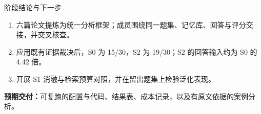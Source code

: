 \documentclass[aspectratio=169,10pt]{beamer}
\begin{document}
\begin{frame}[t]{阶段结论与下一步}
  \vspace{2mm}
  \begin{enumerate}\setlength{\itemsep}{4mm}
    \item {}\par
      六篇论文提炼为统一分析框架；成员围绕同一题集、记忆库、回答与评分交接，并交叉核查。
    \item {}\par
      应用既有证据裁决后，S0 为 15/30，S2 为 19/30；S2 的回答输入约为 S0 的 4.42 倍。
    \item {}\par
      开展 S1 消融与检索预算对照，并在留出题集上检验泛化表现。
  \end{enumerate}
  \vspace{4mm}
  \textbf{预期交付：}可复跑的配置与代码、结果表、成本记录，以及有原文依据的案例分析。
\end{frame}
\end{document}

